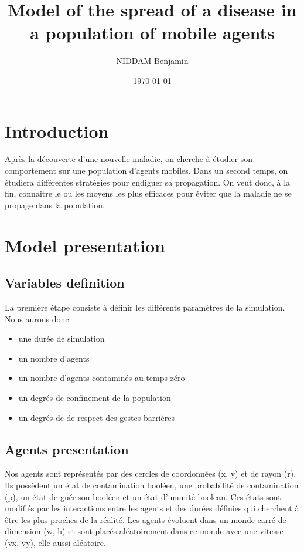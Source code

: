 \documentclass[a4paper, 12pt]{report}
\title{Model of the spread of a disease in a population of mobile agents}
\author{NIDDAM Benjamin}
\date{\today}
\begin{document}
\begin{titlepage}
	\maketitle
\end{titlepage}

\newpage

\tableofcontents

\newpage
\section{Introduction}

Après la découverte d'une nouvelle maladie, on cherche à étudier son comportement sur une population d'agents mobiles.
Dans un second temps, on étudiera différentes stratégies pour endiguer sa propagation. On veut donc, à la fin,
connaitre le ou les moyens les plus efficaces pour éviter que la maladie ne se propage dans la population.

\section{Model presentation}
\subsection{Variables definition}

La première étape consiste à définir les différents paramètres de la simulation. Nous aurons donc:
\begin{itemize}
	\item une durée de simulation
	\item un nombre d'agents
	\item un nombre d'agents contaminés au temps zéro
	\item un degrés de confinement de la population
	\item un degrés de de respect des gestes barrières
\end{itemize}

\subsection{Agents presentation}

Nos agents sont représentés par des cercles de coordonnées (x, y) et de rayon (r). Ils possèdent un état de contamination booléen, une probabilité de contamination (p), un état de guérison booléen et un état d'imunité boolean. Ces états sont modifiés par les interactions entre les agents et des durées définies qui cherchent à être les plus proches de la réalité. Les agents évoluent dans un monde carré de dimension (w, h) et sont placés aléatoirement dans ce monde avec une vitesse (vx, vy), elle aussi aléatoire.
\end{document}
